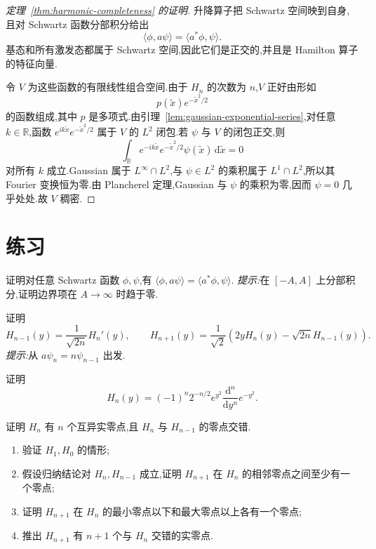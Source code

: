 \begin{proof}[定理~\ref{thm:harmonic-completeness} 的证明]
升降算子把 Schwartz 空间映到自身,且对 Schwartz 函数分部积分给出
\[
\langle\phi,a\psi\rangle=\langle a^{*}\phi,\psi\rangle.
\]
基态和所有激发态都属于 Schwartz 空间,因此它们是正交的,并且是 Hamilton 算子的特征向量.

令 \(V\) 为这些函数的有限线性组合空间.由于 \(H_{n}\) 的次数为 \(n\),\(V\) 正好由形如
\[
p(\widetilde x)e^{-\widetilde x^{2}/2}
\]
的函数组成,其中 \(p\) 是多项式.由引理~\ref{lem:gaussian-exponential-series},对任意 \(k\in\mathbb{R}\),函数 \(e^{ik\widetilde x}e^{-\widetilde x^{2}/2}\) 属于 \(V\) 的 \(L^{2}\) 闭包.若 \(\psi\) 与 \(V\) 的闭包正交,则
\[
\int_{\mathbb{R}}e^{-ik\widetilde x}e^{-\widetilde x^{2}/2}\psi(\widetilde x)\,\mathrm{d}\widetilde x=0
\]
对所有 \(k\) 成立.Gaussian 属于 \(L^{\infty}\cap L^{2}\),与 \(\psi\in L^{2}\) 的乘积属于 \(L^{1}\cap L^{2}\),所以其 Fourier 变换恒为零.由 Plancherel 定理,Gaussian 与 \(\psi\) 的乘积为零,因而 \(\psi=0\) 几乎处处.故 \(V\) 稠密.
\end{proof}

\section{练习}
\label{sec:chapter11-exercises}

\begin{exercise}[升降算子的伴随]\label{ex:ladder-adjoint-schwartz}
证明对任意 Schwartz 函数 \(\phi,\psi\),有 \(\langle\phi,a\psi\rangle=\langle a^{*}\phi,\psi\rangle\).
\emph{提示:}在 \([-A,A]\) 上分部积分,证明边界项在 \(A\to\infty\) 时趋于零.
\end{exercise}

\begin{exercise}\label{ex:hermite-recurrences}
证明
\[
H_{n-1}(y)=\frac{1}{\sqrt{2n}}H_{n}'(y),
\qquad
H_{n+1}(y)=\frac{1}{\sqrt2}\left(2yH_{n}(y)-\sqrt{2n}H_{n-1}(y)\right).
\]
\emph{提示:}从 \(a\psi_{n}=n\psi_{n-1}\) 出发.
\end{exercise}

\begin{exercise}[Rodrigues 公式]\label{ex:hermite-rodrigues}
证明
\[
H_{n}(y)=(-1)^{n}2^{-n/2}e^{y^{2}}\frac{\mathrm{d}^{n}}{\mathrm{d}y^{n}}e^{-y^{2}}.
\]
\end{exercise}

\begin{exercise}\label{ex:hermite-zeros}
证明 \(H_{n}\) 有 \(n\) 个互异实零点,且 \(H_{n}\) 与 \(H_{n-1}\) 的零点交错.
\begin{enumerate}[label=(\alph*)]
\item 验证 \(H_{1},H_{0}\) 的情形;
\item 假设归纳结论对 \(H_{n},H_{n-1}\) 成立,证明 \(H_{n+1}\) 在 \(H_{n}\) 的相邻零点之间至少有一个零点;
\item 证明 \(H_{n+1}\) 在 \(H_{n}\) 的最小零点以下和最大零点以上各有一个零点;
\item 推出 \(H_{n+1}\) 有 \(n+1\) 个与 \(H_{n}\) 交错的实零点.
\end{enumerate}
\end{exercise}

